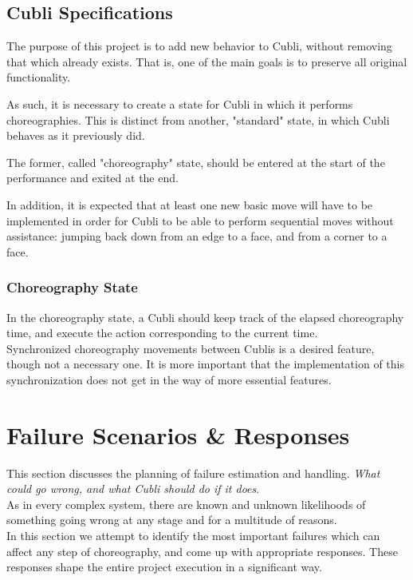 \subsection{Cubli Specifications}

The purpose of this project is to add new behavior to Cubli, without removing that which already exists. That is, one of the main goals is to preserve all original functionality.

As such, it is necessary to create a state for Cubli in which it performs choreographies. This is distinct from another, "standard" state, in which Cubli behaves as it previously did.

The former, called "choreography" state, should be entered at the start of the performance and exited at the end.

In addition, it is expected that at least one new basic move will have to be implemented in order for Cubli to be able to perform sequential moves without assistance: jumping back down from an edge to a face, and from a corner to a face.

\subsubsection{Choreography State}

In the choreography state, a Cubli should keep track of the elapsed choreography time, and execute the action corresponding to the current time.\\

Synchronized choreography movements between Cublis is a desired feature, though not a necessary one. It is more important that the implementation of this synchronization does not get in the way of more essential features.\\

\section{Failure Scenarios \& Responses}
This section discusses the planning of failure estimation and handling.
\textit{What could go wrong, and what Cubli should do if it does}.\\

As in every complex system, there are known and unknown likelihoods of something going wrong at any stage and for a multitude of reasons.\\

In this section we attempt to identify the most important failures which can affect any step of choreography, and come up with appropriate responses. These responses shape the entire project execution in a significant way.\\

